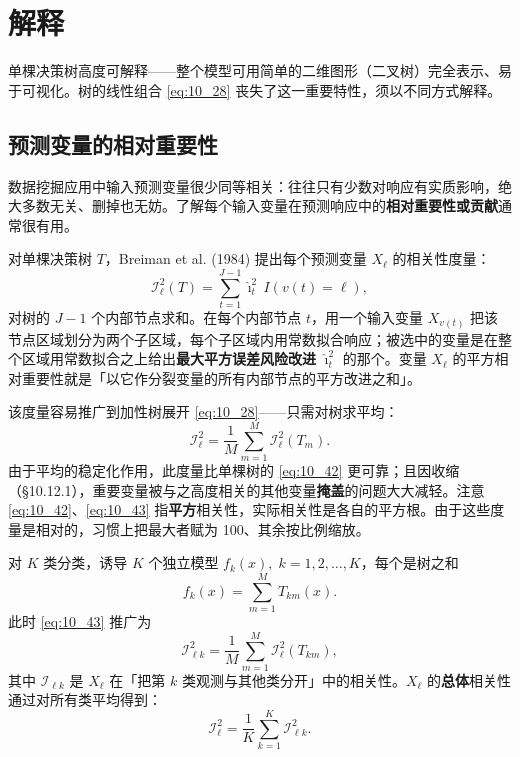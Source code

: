\section{解释}

单棵决策树高度可解释——整个模型可用简单的二维图形（二叉树）完全表示、易于可视化。树的线性组合 \eqref{eq:10_28} 丧失了这一重要特性，须以不同方式解释。

\subsection{预测变量的相对重要性}

数据挖掘应用中输入预测变量很少同等相关：往往只有少数对响应有实质影响，绝大多数无关、删掉也无妨。了解每个输入变量在预测响应中的\textbf{相对重要性或贡献}通常很有用。

对单棵决策树 $T$，Breiman et al. (1984) 提出每个预测变量 $X_\ell$ 的相关性度量：
\begin{equation}\label{eq:10_42}
    \mathcal{I}_\ell^2(T) = \sum_{t=1}^{J-1} \hat\imath_t^2\, I(v(t) = \ell),
\end{equation}
对树的 $J-1$ 个内部节点求和。在每个内部节点 $t$，用一个输入变量 $X_{v(t)}$ 把该节点区域划分为两个子区域，每个子区域内用常数拟合响应；被选中的变量是在整个区域用常数拟合之上给出\textbf{最大平方误差风险改进} $\hat\imath_t^2$ 的那个。变量 $X_\ell$ 的平方相对重要性就是「以它作分裂变量的所有内部节点的平方改进之和」。

该度量容易推广到加性树展开 \eqref{eq:10_28}——只需对树求平均：
\begin{equation}\label{eq:10_43}
    \mathcal{I}_\ell^2 = \frac{1}{M}\sum_{m=1}^{M} \mathcal{I}_\ell^2(T_m).
\end{equation}
由于平均的稳定化作用，此度量比单棵树的 \eqref{eq:10_42} 更可靠；且因收缩（§10.12.1），重要变量被与之高度相关的其他变量\textbf{掩盖}的问题大大减轻。注意 \eqref{eq:10_42}、\eqref{eq:10_43} 指\textbf{平方}相关性，实际相关性是各自的平方根。由于这些度量是相对的，习惯上把最大者赋为 100、其余按比例缩放。

对 $K$ 类分类，诱导 $K$ 个独立模型 $f_k(x),\; k = 1, 2, \ldots, K$，每个是树之和
\begin{equation}\label{eq:10_44}
    f_k(x) = \sum_{m=1}^{M} T_{km}(x).
\end{equation}
此时 \eqref{eq:10_43} 推广为
\begin{equation}\label{eq:10_45}
    \mathcal{I}_{\ell k}^2 = \frac{1}{M}\sum_{m=1}^{M} \mathcal{I}_\ell^2(T_{km}),
\end{equation}
其中 $\mathcal{I}_{\ell k}$ 是 $X_\ell$ 在「把第 $k$ 类观测与其他类分开」中的相关性。$X_\ell$ 的\textbf{总体}相关性通过对所有类平均得到：
\begin{equation}\label{eq:10_46}
    \mathcal{I}_\ell^2 = \frac{1}{K}\sum_{k=1}^{K} \mathcal{I}_{\ell k}^2.
\end{equation}

